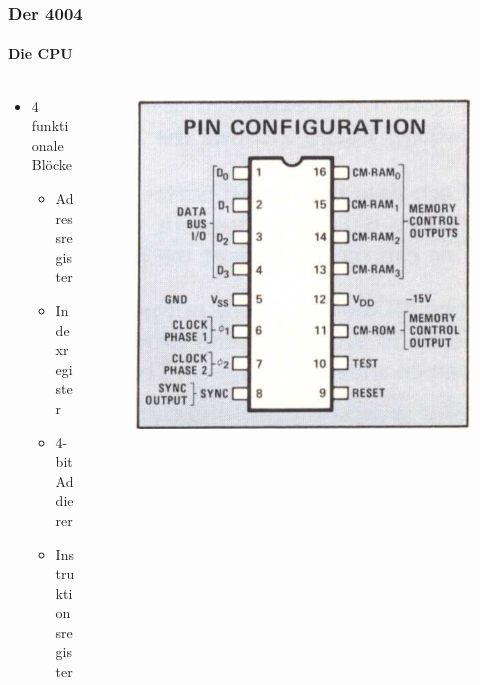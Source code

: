 \begin{frame}
	\frametitle{Der 4004}
	\framesubtitle{Die CPU}
	\begin{columns}
		\begin{column}{.5\textwidth}	
			\begin{itemize}
				\item 4 funktionale Blöcke
				\begin{itemize}
					\item Adressregister
					\item Indexregister
					\item 4-bit Addierer
					\item Instruktionsregister
				\end{itemize}
			\end{itemize}
		\end{column}
		\begin{column}{.5\textwidth}
			\begin{figure}[ht]
				\includegraphics[width=1\linewidth]{images/pins_4004.png}
			\end{figure}
		\end{column}
	\end{columns}
\end{frame}

